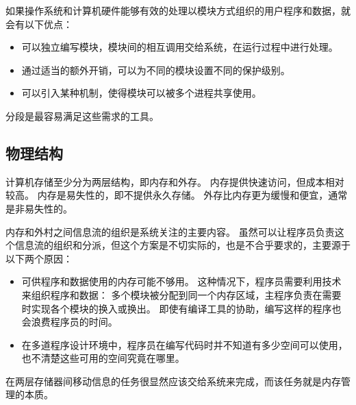 {{        如果操作系统和计算机硬件能够有效的处理以模块方式组织的用户程序和数据，就会有以下优点：

        \begin{itemize}
            \item 可以独立编写模块，模块间的相互调用交给系统，在运行过程中进行处理。
            \item 通过适当的额外开销，可以为不同的模块设置不同的保护级别。
            \item 可以引入某种机制，使得模块可以被多个进程共享使用。
        \end{itemize}

        分段是最容易满足这些需求的工具。
    }

    \subsection{物理结构}
    {
        计算机存储至少分为两层结构，即内存和外存。
        内存提供快速访问，但成本相对较高。
        内存是易失性的，即不提供永久存储。
        外存比内存更为缓慢和便宜，通常是非易失性的。

        内存和外村之间信息流的组织是系统关注的主要内容。
        虽然可以让程序员负责这个信息流的组织和分派，但这个方案是不切实际的，也是不合乎要求的，主要源于以下两个原因：

        \begin{itemize}
            \item
            {
                可供程序和数据使用的内存可能不够用。
                这种情况下，程序员需要利用技术来组织程序和数据：
                多个模块被分配到同一个内存区域，主程序负责在需要时实现各个模块的换入或换出。
                即使有编译工具的协助，编写这样的程序也会浪费程序员的时间。
            }
            \item
            {
                在多道程序设计环境中，程序员在编写代码时并不知道有多少空间可以使用，也不清楚这些可用的空间究竟在哪里。
            }
        \end{itemize}

        在两层存储器间移动信息的任务很显然应该交给系统来完成，而该任务就是内存管理的本质。
    }
}
